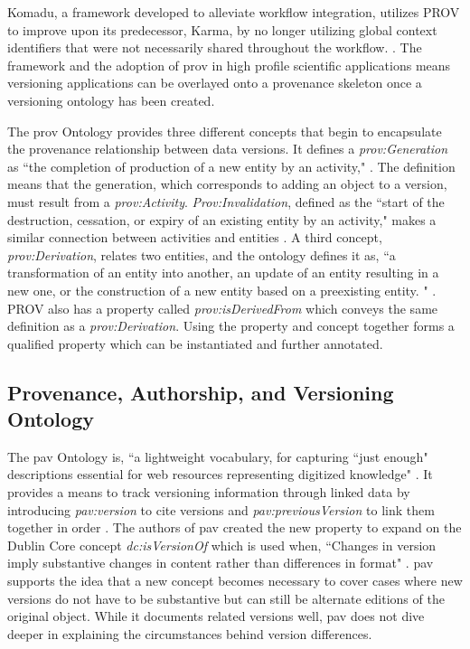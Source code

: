 Komadu, a framework developed to alleviate workflow integration, utilizes PROV to improve upon its predecessor, Karma, by no longer utilizing global context identifiers that were not necessarily shared throughout the workflow. \cite{Suriarachchi_2015}.
The framework and the adoption of \gls{prov} in high profile scientific applications means versioning applications can be overlayed onto a \gls{provenance} skeleton once a versioning ontology has been created.

The \gls{prov} Ontology provides three different concepts that begin to encapsulate the provenance relationship between data versions.
It defines a \textit{prov:Generation} as ``the completion of production of a new entity by an activity," \cite{Lebo2013}.
The definition means that the generation, which corresponds to adding an object to a version, must result from a \textit{prov:Activity}.
\textit{Prov:Invalidation}, defined as the ``start of the destruction, cessation, or expiry of an existing entity by an activity," makes a similar connection between activities and entities \cite{Lebo2013}.
A third concept, \textit{prov:Derivation}, relates two entities, and the ontology defines it as, ``a transformation of an entity into another, an update of an entity resulting in a new one, or the construction of a new entity based on a preexisting entity. " \cite{Lebo2013}.
PROV also has a property called \textit{prov:isDerivedFrom} which conveys the same definition as a \textit{prov:Derivation}.
Using the property and concept together forms a qualified property which can be instantiated and further annotated.

\subsection{Provenance, Authorship, and Versioning Ontology}

The \gls{pav} Ontology is, ``a lightwei\-ght vocabulary, for capturing ``just enough" descriptions essential for web resources representing digitized knowledge" \cite{Ciccarese2013}.
It provides a means to track versioning information through linked data by introducing \textit{pav:version} to cite versions and \textit{pav:previousVersion} to link them together in order \cite{Ciccarese2013}.
The authors of \gls{pav} created the new property to expand on the Dublin Core concept \textit{dc:isVersionOf} which is used when, ``Changes in version imply substantive changes in content rather than differences in format" \cite{DCMI2012}.
\gls{pav} supports the idea that a new concept becomes necessary to cover cases where new \glspl{version} do not have to be substantive but can still be alternate editions of the original object.
While it documents related versions well, \gls{pav} does not dive deeper in explaining the circumstances behind version differences.

